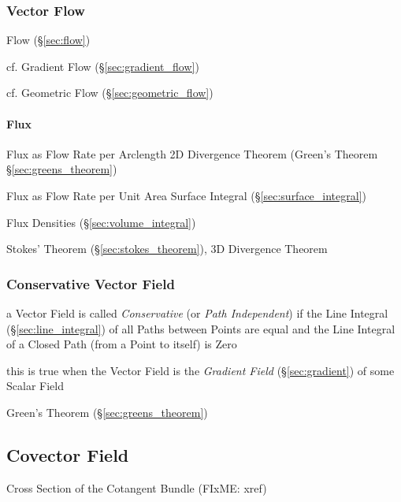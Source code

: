 \subsubsection{Vector Flow}\label{sec:vector_flow}

Flow (\S\ref{sec:flow})

cf. Gradient Flow (\S\ref{sec:gradient_flow})

cf. Geometric Flow (\S\ref{sec:geometric_flow})



\paragraph{Flux}\label{sec:flux}\hfill

Flux as Flow Rate per Arclength \fist 2D Divergence Theorem (Green's Theorem
\S\ref{sec:greens_theorem})

Flux as Flow Rate per Unit Area \fist Surface Integral
(\S\ref{sec:surface_integral})

Flux Densities \fist (\S\ref{sec:volume_integral})

Stokes' Theorem (\S\ref{sec:stokes_theorem}), 3D Divergence Theorem



\subsubsection{Conservative Vector Field}\label{sec:conservative_vector_field}

a Vector Field is called \emph{Conservative} (or \emph{Path Independent}) if
the Line Integral (\S\ref{sec:line_integral}) of all Paths between Points are
equal and the Line Integral of a Closed Path (from a Point to itself) is Zero

this is true when the Vector Field is the \emph{Gradient Field}
(\S\ref{sec:gradient}) of some Scalar Field

\fist Green's Theorem (\S\ref{sec:greens_theorem})



\subsection{Covector Field}\label{sec:covector_field}

Cross Section of the Cotangent Bundle (FIxME: xref)



